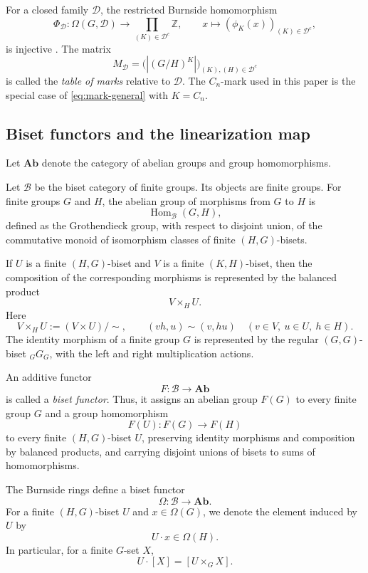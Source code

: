 \documentclass[a4paper,11pt]{article}
\numberwithin{equation}{section}
\newcommand{\Z}{\mathbb{Z}}
\newcommand{\Hom}{\operatorname{Hom}}
\begin{document}
For a closed family $\mathcal D$, the restricted Burnside homomorphism
\begin{equation}\label{eq:partial-burnside-hom}
  \Phi_{\mathcal D}:\Omega(G,\mathcal D)
  \longrightarrow\prod_{(K)\in\mathcal D^c}\Z,
  \qquad x\longmapsto(\phi_K(x))_{(K)\in\mathcal D^c},
\end{equation}
is injective \cite[Lemma~3.3]{YoshidaGeneralized}. The matrix
\[
  M_{\mathcal D}=
  \bigl(|(G/H)^K|\bigr)_{(K),(H)\in\mathcal D^c}
\]
is called the \emph{table of marks} relative to $\mathcal D$. The $C_n$-mark used in
this paper is the special case of \eqref{eq:mark-general} with $K=C_n$.

\subsection{Biset functors and the linearization map}
\label{subsec:burnside-functoriality}

Let $\mathbf{Ab}$ denote the category of abelian groups and group homomorphisms.

Let $\mathcal B$ be the biset category of finite groups. Its objects are finite groups.
For finite groups $G$ and $H$, the abelian group of morphisms from $G$ to $H$ is
\[
  \Hom_{\mathcal B}(G,H),
\]
defined as the Grothendieck group, with respect to disjoint union, of the commutative
monoid of isomorphism classes of finite $(H,G)$-bisets.

If $U$ is a finite $(H,G)$-biset and $V$ is a finite $(K,H)$-biset, then the
composition of the corresponding morphisms is represented by the balanced product
\[
  V\times_H U.
\]
Here
\[
  V\times_H U
  :=(V\times U)/{\sim},
  \qquad
  (vh,u)\sim(v,hu)
  \quad
  (v\in V,\ u\in U,\ h\in H).
\]
The identity morphism of a finite group $G$ is represented by the regular
$(G,G)$-biset ${}_GG_G$, with the left and right multiplication actions.

An additive functor
\[
  F:\mathcal B\longrightarrow\mathbf{Ab}
\]
is called a \emph{biset functor}. Thus, it assigns an abelian group $F(G)$ to every
finite group $G$ and a group homomorphism
\[
  F(U):F(G)\longrightarrow F(H)
\]
to every finite $(H,G)$-biset $U$, preserving identity morphisms and composition by
balanced products, and carrying disjoint unions of bisets to sums of homomorphisms.

The Burnside rings define a biset functor
\[
  \Omega:\mathcal B\longrightarrow\mathbf{Ab}.
\]
For a finite $(H,G)$-biset $U$ and $x\in\Omega(G)$, we denote the element induced by
$U$ by
\[
  U\cdot x\in\Omega(H).
\]
In particular, for a finite $G$-set $X$,
\[
  U\cdot[X]=[U\times_G X].
\]
\end{document}

